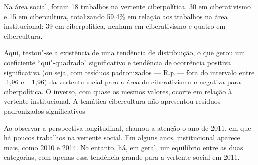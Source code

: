 Na área social, foram 18 trabalhos na vertente ciberpolítica, 30 em ciberativismo e 15 em cibercultura, totalizando 59,4\% em relação aos trabalhos na área institucional: 39 em ciberpolítica, nenhum em ciberativismo e quatro em cibercultura.

Aqui, testou"-se a existência de uma tendência de distribuição, o que
gerou um coeficiente ``qui"-quadrado'' significativo e tendência de
ocorrência positiva significativa (ou seja, com resíduos padronizados ---
R.p.\,--- fora do intervalo entre -1,96 e +1,96) da vertente social para a
área de ciberativismo e negativa para ciberpolítica. O inverso, com
quase os mesmos valores, ocorre em relação à vertente institucional. A
temática cibercultura não apresentou resíduos padronizados
significativos.

Ao observar a perspectiva longitudinal, chamou a atenção o ano de 2011,
em que há poucos trabalhos na vertente social. Em alguns anos,
institucional aparece mais, como 2010 e 2014. No entanto, há, em geral,
um equilíbrio entre as duas categorias, com apenas essa tendência grande
para a vertente social em 2011.

